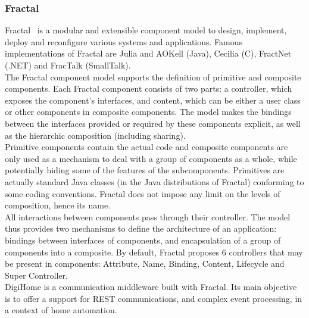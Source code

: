 \subsubsection{Fractal}

Fractal~\cite{Bruneton:2006} is a modular and extensible component model to design, implement, deploy and reconfigure various systems and applications. Famous implementations of Fractal are Julia and AOKell (Java), Cecilia (C), FractNet (.NET) and FracTalk (SmallTalk).\\
The Fractal component model supports the definition of primitive and composite components. Each Fractal component consists of two parts: a controller, which exposes the component's interfaces, and content, which can be either a user class or other components in composite components. The model makes the bindings between the interfaces provided or required by these components explicit, as well as the hierarchic composition (including sharing).\\
Primitive components contain the actual code and composite components are only used as a mechanism to deal with a group of components as a whole, while potentially hiding some of the features of the subcomponents. Primitives are actually standard Java classes (in the Java distributions of Fractal) conforming to some coding conventions. Fractal does not impose any limit on the levels of composition, hence its name.\\
All interactions between components pass through their controller. The model thus provides two mechanisms to define the architecture of an application: bindings between interfaces of components, and encapsulation of a group of components into a composite. By default, Fractal proposes 6 controllers that may be present in components: Attribute, Name, Binding, Content, Lifecycle and Super Controller.\\
DigiHome\cite{Romero:2010} is a communication middleware built with Fractal. Its main objective is to offer a support for REST communications, and complex event processing, in a context of home automation.

